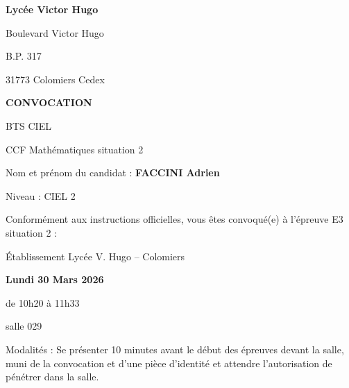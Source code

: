 

\usepackage[left=2.0cm, right=2.0cm, top=1.0cm, bottom=2.0cm]{geometry}
\setlength{\parindent}{0.0cm}       %


\makeatletter
\renewcommand{\@evenfoot}%
        {}%
\renewcommand{\@oddfoot}{\@evenfoot}
\makeatother

\renewcommand{\chapitre}{CCF}
\renewcommand{\seance}{convocation}
\renewcommand{\classe}{CIEL 2}

\newcommand{\datepassage}{30/03/2026}
\newcommand{\salle}{salle 029}



\begin{minipage}{0.3\lw}
\small\bf Lycée Victor Hugo

Boulevard Victor Hugo

B.P. 317

31773 Colomiers Cedex\sautp ~
\end{minipage}
\hfill
\begin{minipage}{0.65\lw}
\begin{center}
\Large \bf CONVOCATION\sautm

BTS CIEL\sautm

CCF Mathématiques situation 2
\end{center}
\end{minipage}

\vfill

Nom et prénom du candidat : {\large \bf FACCINI Adrien}\sautp

Niveau : CIEL 2

\vfill

Conformément aux instructions officielles, vous êtes convoqué(e) à l’épreuve E3 situation 2 :\sautp

\begin{center}
Établissement Lycée V. Hugo -- Colomiers \sautp

\large \bf Lundi 30 Mars 2026\sautb

de 10h20 à 11h33\sautb

salle 029
\end{center}

\vfill 

Modalités : Se présenter 10 minutes avant le début des épreuves devant la salle, muni
de la convocation et d’une pièce d’identité et attendre l’autorisation de pénétrer dans la
salle.

